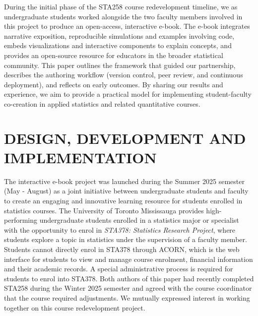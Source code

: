 \documentclass[11pt]{article}
\begin{document}
During the initial phase of the STA258 course redevelopment timeline, we as undergraduate students worked alongside the two faculty members involved in this project to produce an open-access, interactive e-book. 
The e-book integrates narrative exposition, reproducible simulations and examples involving code, embeds visualizations and interactive components to explain concepts, and provides an open-source resource for educators in the broader statistical community.
This paper outlines the framework that guided our partnership, describes the authoring workflow (version control, peer review, and continuous deployment), and reflects on early outcomes. 
By sharing our results and experience, we aim to provide a practical model for implementing student-faculty co-creation in applied statistics and related quantitative courses.

%
%


\section{DESIGN, DEVELOPMENT AND IMPLEMENTATION}
\label{sec:design}

The interactive e-book project was launched during the Summer 2025 semester (May - August) as a joint initiative between undergraduate students and faculty to create an engaging and innovative learning resource for students enrolled in statistics courses. 
The University of Toronto Mississauga provides high-performing undergraduate students enrolled in a statistics major or specialist with the opportunity to enrol in \textit{STA378: Statistics Research Project}, where students explore a topic in statistics under the supervision of a faculty member.
Students cannot directly enrol in STA378 through ACORN, which is the web interface for students to view and manage course enrolment, financial information and their academic records.
A special administrative process is required for students to enrol into STA378.
Both authors of this paper had recently completed STA258 during the Winter 2025 semester and agreed with the course coordinator that the course required adjustments. 
We mutually expressed interest in working together on this course redevelopment project.
\end{document}
